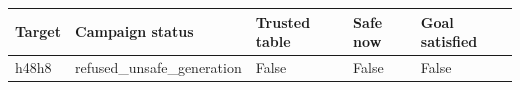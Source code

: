 {\small
\begin{tabular}{lllll}
\hline
Target & Campaign status & Trusted table & Safe now & Goal satisfied \\
\hline
h48h8 & refused\_unsafe\_generation & False & False & False \\
\hline
\end{tabular}
}
